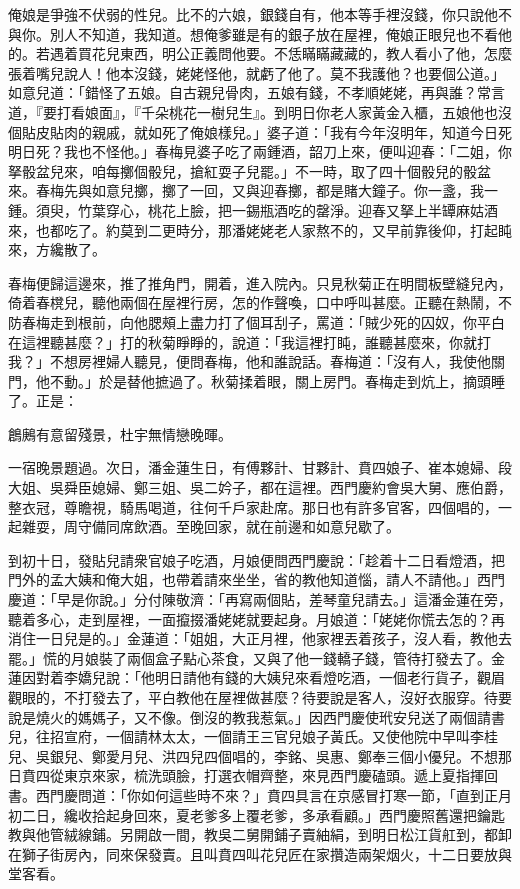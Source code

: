 俺娘是爭強不伏弱的性兒。比不的六娘，銀錢自有，他本等手裡沒錢，你只說他不與你。別人不知道，我知道。{}想俺爹雖是有的銀子放在屋裡，俺娘正眼兒也不看他的。若遇着買花兒東西，明公正義問他要。不恁瞞瞞藏藏的，教人看小了他，怎麼張着嘴兒說人！他本沒錢，姥姥怪他，就虧了他了。莫不我護他？也要個公道。」{}如意兒道：「錯怪了五娘。自古親兒骨肉，五娘有錢，不孝順姥姥，再與誰？常言道，『要打看娘面』，『千朵桃花一樹兒生』。{}到明日你老人家黃金入櫃，五娘他也沒個貼皮貼肉的親戚，就如死了俺娘樣兒。」婆子道：「我有今年沒明年，知道今日死明日死？我也不怪他。」春梅見婆子吃了兩鍾酒，韶刀上來，便叫迎春：「二姐，你拏骰盆兒來，咱每擲個骰兒，搶紅耍子兒罷。」不一時，取了四十個骰兒的骰盆來。春梅先與如意兒擲，擲了一回，又與迎春擲，都是賭大鐘子。你一盞，我一鍾。須臾，竹葉穿心，桃花上臉，把一錫瓶酒吃的罄淨。{}迎春又拏上半罈麻姑酒來，也都吃了。約莫到二更時分，那潘姥姥老人家熬不的，又早前靠後仰，打起盹來，方纔散了。

春梅便歸這邊來，推了推角門，開着，進入院內。只見秋菊正在明間板壁縫兒內，倚着春櫈兒，聽他兩個在屋裡行房，怎的作聲喚，口中呼叫甚麼。正聽在熱鬧，不防春梅走到根前，向他腮頰上盡力打了個耳刮子，罵道：「賊少死的囚奴，你平白在這裡聽甚麼？」打的秋菊睜睜的，說道：「我這裡打盹，誰聽甚麼來，你就打我？」不想房裡婦人聽見，便問春梅，他和誰說話。春梅道：「沒有人，我使他關門，他不動。」於是替他摭過了。秋菊揉着眼，關上房門。春梅走到炕上，摘頭睡了。正是：

\begin{myquote}
鶬鶊有意留殘景，杜宇無情戀晚暉。
\end{myquote}

一宿晚景題過。次日，潘金蓮生日，有傅夥計、甘夥計、賁四娘子、崔本媳婦、段大姐、吳舜臣媳婦、鄭三姐、吳二妗子，都在這裡。西門慶約會吳大舅、應伯爵，整衣冠，尊瞻視，騎馬喝道，往何千戶家赴席。那日也有許多官客，四個唱的，一起雜耍，周守備同席飲酒。至晚回家，就在前邊和如意兒歇了。

到初十日，發貼兒請衆官娘子吃酒，月娘便問西門慶說：「趁着十二日看燈酒，把門外的孟大姨和俺大姐，也帶着請來坐坐，省的教他知道惱，請人不請他。」西門慶道：「早是你說。」分付陳敬濟：「再寫兩個貼，差琴童兒請去。」這潘金蓮在旁，聽着多心，走到屋裡，一面攛掇潘姥姥就要起身。月娘道：「姥姥你慌去怎的？再消住一日兒是的。」金蓮道：「姐姐，大正月裡，他家裡丟着孩子，沒人看，教他去罷。」慌的月娘裝了兩個盒子點心茶食，又與了他一錢轎子錢，管待打發去了。金蓮因對着李嬌兒說：「他明日請他有錢的大姨兒來看燈吃酒，一個老行貨子，觀眉觀眼的，不打發去了，平白教他在屋裡做甚麼？待要說是客人，沒好衣服穿。待要說是燒火的媽媽子，又不像。倒沒的教我惹氣。」因西門慶使玳安兒送了兩個請書兒，往招宣府，一個請林太太，一個請王三官兒娘子黃氏。又使他院中早叫李桂兒、吳銀兒、鄭愛月兒、洪四兒四個唱的，李銘、吳惠、鄭奉三個小優兒。不想那日賁四從東京來家，梳洗頭臉，打選衣帽齊整，來見西門慶磕頭。遞上夏指揮回書。西門慶問道：「你如何這些時不來？」賁四具言在京感冒打寒一節，「直到正月初二日，纔收拾起身回來，夏老爹多上覆老爹，多承看顧。」西門慶照舊還把鑰匙教與他管絨線鋪。另開啟一間，教吳二舅開鋪子賣紬絹，到明日松江貨舡到，都卸在獅子街房內，同來保發賣。且叫賁四叫花兒匠在家攢造兩架烟火，十二日要放與堂客看。

